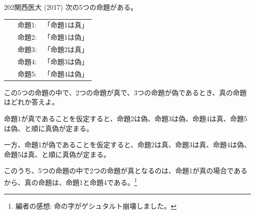 \begin{prob}{202}{}{関西医大 (2017)}
 次の5つの命題がある。

 \begin{tabular}{cc}
  ~~~命題1: & 「命題1は真」\\
  ~~~命題2: & 「命題1は偽」\\
  ~~~命題3: & 「命題2は真」\\
  ~~~命題4: & 「命題3は偽」\\
  ~~~命題5: & 「命題4は偽」\\
 \end{tabular}

 この5つの命題の中で、2つの命題が真で、3つの命題が偽であるとき、真の命題はどれか答えよ。
\end{prob}

命題1が真であることを仮定すると、命題2は偽、命題3は偽、命題4は真、命題5は偽、と順に真偽が定まる。

一方、命題1が偽であることを仮定すると、命題2は真、命題3は真、命題4は偽、命題5は真、と順に真偽が定まる。

このうち、5つの命題の中で2つの命題が真となるのは、命題1が真の場合であるから、真の命題は、命題1と命題4である。\footnote{編者の感想: 命の字がゲシュタルト崩壊しました。}